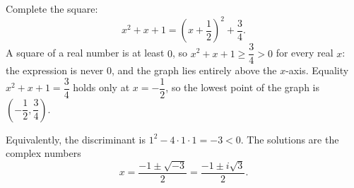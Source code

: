 Complete the square:
\[x^2+x+1=\left(x+\dfrac{1}{2}\right)^2+\dfrac{3}{4}.\]
A square of a real number is at least $0$, so $x^2+x+1\ge\dfrac{3}{4}>0$ for every real $x$: the expression is never $0$, and the graph lies entirely above the $x$-axis. Equality $x^2+x+1=\dfrac{3}{4}$ holds only at $x=-\dfrac{1}{2}$, so the lowest point of the graph is $\boxed{\left(-\dfrac{1}{2},\dfrac{3}{4}\right)}$.

Equivalently, the discriminant is $1^2-4\cdot1\cdot1=-3<0$. The solutions are the complex numbers
\[x=\dfrac{-1\pm\sqrt{-3}}{2}=\boxed{\dfrac{-1\pm i\sqrt3}{2}}.\]
